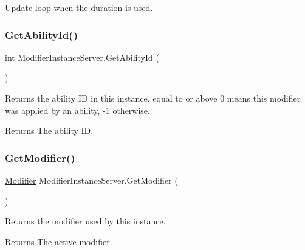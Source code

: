 Update loop when the duration is used. 

\hypertarget{class_modifier_instance_server_a7ee38df01e1b762680b7e07379cfe14f}{}\label{class_modifier_instance_server_a7ee38df01e1b762680b7e07379cfe14f} 
\subsubsection{\texorpdfstring{Get\+Ability\+Id()}{GetAbilityId()}}
{\footnotesize\ttfamily int Modifier\+Instance\+Server.\+Get\+Ability\+Id (\begin{DoxyParamCaption}{ }\end{DoxyParamCaption})}



Returns the ability ID in this instance, equal to or above 0 means this modifier was applied by an ability, -\/1 otherwise. 

\begin{DoxyReturn}{Returns}
The ability ID.
\end{DoxyReturn}
\hypertarget{class_modifier_instance_server_a60d143f26963aec0a777ec248de46d99}{}\label{class_modifier_instance_server_a60d143f26963aec0a777ec248de46d99} 
\subsubsection{\texorpdfstring{Get\+Modifier()}{GetModifier()}}
{\footnotesize\ttfamily \hyperlink{class_modifier}{Modifier} Modifier\+Instance\+Server.\+Get\+Modifier (\begin{DoxyParamCaption}{ }\end{DoxyParamCaption})}



Returns the modifier used by this instance. 

\begin{DoxyReturn}{Returns}
The active modifier.
\end{DoxyReturn}
\hypertarget{class_modifier_instance_server_aac2b7d540a4a053d8b76f85b4e626a7e}{}\label{class_modifier_instance_server_aac2b7d540a4a053d8b76f85b4e626a7e} 
